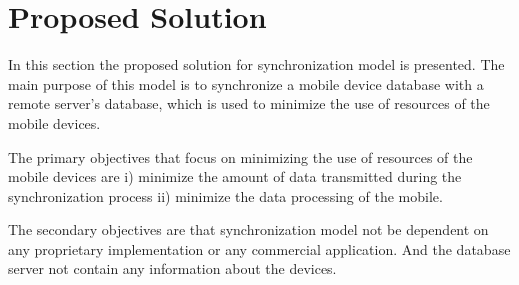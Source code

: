 \documentclass[conference]{IEEEtran}
\begin{document}
\section{Proposed Solution}

In this section the proposed solution for synchronization model is presented. The main purpose of this model is to synchronize a mobile device database with a remote server's database, which is used to minimize the use of resources of the mobile devices.

The primary objectives that focus on minimizing the use of resources of the mobile devices are i) minimize the amount of data transmitted during the synchronization process ii) minimize the data processing of the mobile.

The secondary objectives are that synchronization model not be dependent on any proprietary implementation or any commercial application. And the database server not contain any information about the devices.
\end{document}
